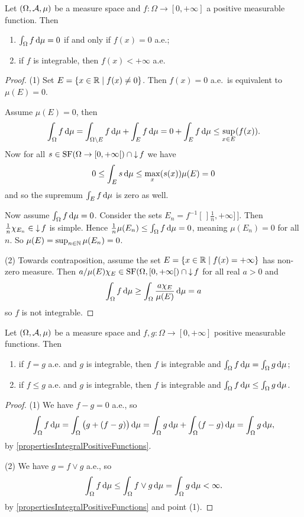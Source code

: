 \begin{proposition} \label{functionPropertiesFromIntegral}
Let $\sSet{\Omega, \mathcal{A}, \mu}$ be a measure space and $f:\Omega\to[0,+\infty]$ a positive measurable function. Then
\begin{enumerate}
\item $\int_\Omega f\operatorname{d \!}{\mu} = 0$ \textup{if and only if} $f(x) = 0$ a.e.;
\item if $f$ is integrable, then $f(x)< +\infty$ a.e.\
\end{enumerate}
\end{proposition}
\begin{proof}(1) Set $E = \setbuilder{x\in\R}{f(x) \neq 0}$. Then $f(x) = 0$ a.e.\ is equivalent to $\mu(E) = 0$.

Assume $\mu(E) = 0$, then 
\[ \int_\Omega f\operatorname{d \!}{\mu} = \int_{\Omega\setminus E} f\operatorname{d \!}{\mu} + \int_E f\operatorname{d \!}{\mu} = 0+\int_E f\operatorname{d \!}{\mu} \leq \sup_{x\in E}(f(x)). \]
Now for all $s\in\SF(\Omega\to \interval[co]{0,+\infty})\cap \downset f$ we have
\[ 0\leq \int_E s \operatorname{d \!}{\mu}\leq \max_x(s(x))\mu(E) = 0  \]
and so the supremum $\int_E f\operatorname{d \!}{\mu}$ is zero as well.

Now assume $\int_\Omega f\operatorname{d \!}{\mu} = 0$. Consider the sets $E_n = f^{-1}[\,]\frac{1}{n},+\infty]\,]$. Then $\frac{1}{n}\chi_{E_n}\in \operatorname{\downarrow} f$ is simple. Hence $\frac{1}{n}\mu(E_n)\leq \int_\Omega f\operatorname{d \!}{\mu} = 0$, meaning $\mu(E_n) = 0$ for all $n$. So $\mu(E) = \sup_{n\in\mathbb{N}}\mu(E_n) = 0$.

(2) Towards contraposition, assume the set $E = \setbuilder{x\in\R}{f(x) = +\infty}$ has non-zero measure. Then $a/\mu(E)\chi_E\in\SF(\Omega, \interval[co]{0,+\infty})\cap \downset f$ for all real $a>0$ and
\[  \int_\Omega f\operatorname{d \!}{\mu} \geq \int_\Omega \frac{a\chi_E}{\mu(E)}\operatorname{d \!}{\mu} = a  \]
so $f$ is not integrable.
\end{proof}
\begin{corollary} \label{integralsAlmostEverywhereComparableFunctions}
Let $\sSet{\Omega, \mathcal{A}, \mu}$ be a measure space and $f,g:\Omega\to[0,+\infty]$ positive measurable functions. Then
\begin{enumerate}
\item if $f = g$ a.e. and $g$ is integrable, then $f$ is integrable and $\int_\Omega f\operatorname{d \!}{\mu} = \int_\Omega g\operatorname{d \!}{\mu}$;
\item if $f \leq g$ a.e. and $g$ is integrable, then $f$ is integrable and $\int_\Omega f\operatorname{d \!}{\mu} \leq \int_\Omega g\operatorname{d \!}{\mu}$.
\end{enumerate}
\end{corollary}
\begin{proof}
(1) We have $f-g = 0$ a.e., so
\[ \int_\Omega f\operatorname{d \!}{\mu} = \int_\Omega \big(g + (f-g)\big)\operatorname{d \!}{\mu} = \int_\Omega g\operatorname{d \!}{\mu} + \int_\Omega (f-g)\operatorname{d \!}{\mu} = \int_\Omega g\operatorname{d \!}{\mu}, \]
by \ref{propertiesIntegralPositiveFunctions}.

(2) We have $g = f\vee g$ a.e., so
\[ \int_\Omega f\operatorname{d \!}{\mu} \leq \int_\Omega f\vee g\operatorname{d \!}{\mu} = \int_\Omega g \operatorname{d \!}{\mu} < \infty. \]
by \ref{propertiesIntegralPositiveFunctions} and point (1).
\end{proof}

